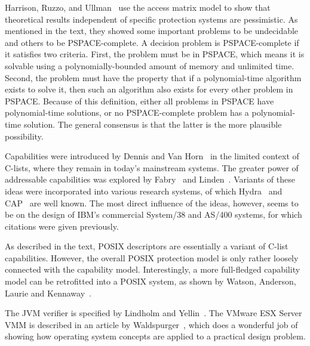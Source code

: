 Harrison, Ruzzo, and Ullman~\cite{max1040} use the access matrix model
to show that theoretical results independent of specific protection
systems are pessimistic.  As mentioned in the text, they showed some
important problems to be undecidable and others to be
PSPACE-complete.  A decision problem is PSPACE-complete if it satisfies
two criteria.  First, the problem must be in PSPACE, which means it is
solvable  using a polynomially-bounded amount of memory and
unlimited time.  Second, the problem must have the property that if a
polynomial-time algorithm exists to solve it, then such an algorithm
also exists for every other problem in PSPACE.  Because of this definition,
either all problems in PSPACE have polynomial-time
solutions, or no PSPACE-complete problem has a polynomial-time solution.  The general
consensus is that the latter is the more plausible possibility.

Capabilities were introduced by Dennis and
Van Horn~\cite{max1090} in the limited
context of C-lists, where they remain in today's mainstream systems.
The greater power of addressable capabilities was explored by
Fabry~\cite{max1034} and Linden~\cite{max1086}.
Variants of these ideas were incorporated into various research
systems, of which Hydra~\cite{max1088,max1033} and CAP~\cite{max1041}
are well known. The most direct influence of the ideas, however, seems
to be on the design of IBM's commercial System/38 and AS/400 systems,
for which citations were given previously.

As described in the text, POSIX descriptors are essentially a variant
of C-list capabilities.  However, the overall POSIX protection model
is only rather loosely connected with the capability model.
Interestingly, a more full-fledged capability model can be
retrofitted into a POSIX system, as shown
by Watson, Anderson, Laurie and Kennaway~\cite{max1198}.

The JVM verifier is specified by Lindholm and
Yellin~\cite{max1103}.  The VMware ESX Server VMM is described in an article by
Waldspurger~\cite{max1095}, which does a
wonderful job of showing how operating system concepts are applied to
a practical design problem.

